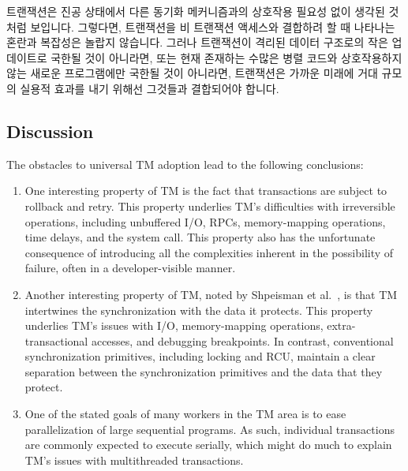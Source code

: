 트랜잭션은 진공 상태에서 다른 동기화 메커니즘과의 상호작용 필요성 없이 생각된
것처럼 보입니다.
그렇다면, 트랜잭션을 비 트랜잭션 액세스와 결합하려 할 때 나타나는 혼란과
복잡성은 놀랍지 않습니다.
그러나 트랜잭션이 격리된 데이터 구조로의 작은 업데이트로 국한될 것이 아니라면,
또는 현재 존재하는 수많은 병렬 코드와 상호작용하지 않는 새로운 프로그램에만
국한될 것이 아니라면, 트랜잭션은 가까운 미래에 거대 규모의 실용적 효과를 내기
위해선 그것들과 결합되어야 합니다.

\subsection{Discussion}
\label{sec:future:Discussion}

The obstacles to universal TM adoption lead to the following
conclusions:

\begin{enumerate}
\item	One interesting property of TM is the fact that transactions are
	subject to rollback and retry.
	This property underlies TM's difficulties with irreversible
	operations, including unbuffered I/O, RPCs, memory-mapping
	operations, time delays, and the  system call.
	This property also has the unfortunate consequence of introducing
	all the complexities inherent in the possibility of failure,
	often in a developer-visible manner.
\item	Another interesting property of TM, noted by
	Shpeisman et al.~\cite{TatianaShpeisman2009CppTM}, is that TM
	intertwines the synchronization with the data it protects.
	This property underlies TM's issues with I/O, memory-mapping
	operations, extra-transactional accesses, and debugging
	breakpoints.
	In contrast, conventional synchronization primitives, including
	locking and RCU, maintain a clear separation between the
	synchronization primitives and the data that they protect.
\item	One of the stated goals of many workers in the TM area is to
	ease parallelization of large sequential programs.
	As such, individual transactions are commonly expected to
	execute serially, which might do much to explain TM's issues
	with multithreaded transactions.
\end{enumerate}

